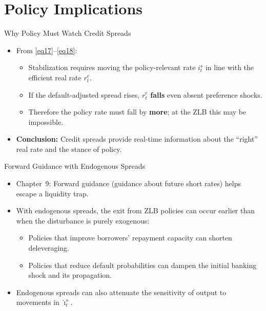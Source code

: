 \documentclass[11pt,aspectratio=169]{beamer}
\begin{document}
\section{Policy Implications}

\begin{frame}{Why Policy Must Watch Credit Spreads}
\small
\begin{itemize}
  \item From \eqref{eq17}--\eqref{eq18}:
  \begin{itemize}
    \item Stabilization requires moving the policy-relevant rate $i_t^s$ in line with the efficient real rate $r_t^{e}$.
    \item If the default-adjusted spread rises, $r_t^{e}$ \textbf{falls} even absent preference shocks.
    \item Therefore the policy rate must fall by \textbf{more}; at the ZLB this may be impossible.
  \end{itemize}
  \vspace{0.25em}
  \item \textbf{Conclusion:} Credit spreads provide real-time information about the ``right'' real rate and the stance of policy.
\end{itemize}
\end{frame}

\begin{frame}{Forward Guidance with Endogenous Spreads}
\small
\begin{itemize}
  \item Chapter~9: Forward guidance (guidance about future short rates) helps escape a liquidity trap.
  \vspace{0.25em}
  \item With endogenous spreads, the exit from ZLB policies can occur earlier than when the disturbance is purely exogenous:
  \begin{itemize}
    \item Policies that improve borrowers' repayment capacity can shorten deleveraging.
    \item Policies that reduce default probabilities can dampen the initial banking shock and its propagation.
  \end{itemize}
  \vspace{0.25em}
  \item Endogenous spreads can also attenuate the sensitivity of output to movements in $\hat{\imath}_t^s$.
\end{itemize}
\end{frame}
\end{document}
